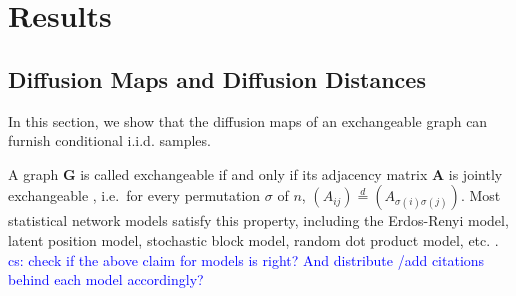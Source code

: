 \documentclass[11pt]{article}
\theoremstyle{definition}
\newcommand{\cs}[1]{\textcolor{blue}{cs: #1}}
\begin{document}

	\vspace*{-0.2cm}
\section{Results}
\label{sec:method}
	\vspace*{-0.2cm}
\subsection{Diffusion Maps and Diffusion Distances}
\label{ssec:method2}

In this section, we show that the diffusion maps of an exchangeable graph \cite{coifman2006diffusion} can furnish conditional i.i.d. samples.

A graph $\mathbf{G}$ is called exchangeable if and only if its adjacency matrix $\mathbf{A}$ is jointly exchangeable \citep{orbanz2015bayesian}, i.e.~for every permutation $\sigma$ of $n$, $(A_{ij}) \stackrel{d}{=} (A_{\sigma(i) \sigma(j)})$. Most statistical network models satisfy this property, including the Erdos-Renyi model, latent position model, stochastic block model, random dot product model, etc. \citep{HollandEtAl1983, YoungScheinerman2007,karrer2011stochastic,ZhaoLevinaZhu2012}. 
\cs{check if the above claim for models is right? And distribute /add citations behind each model accordingly?}
\end{document}
